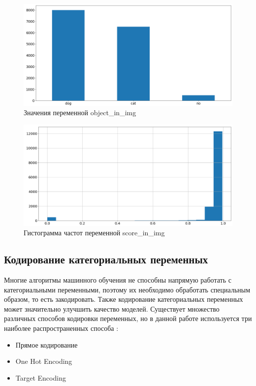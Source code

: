 \documentclass[14pt]{mmcs_article}
\begin{document}
\begin{figure}[H]
	\centering
	\includegraphics[scale=0.5]{objectimg.png}
	\caption{Значения переменной object\_in\_img}\label{analyse:objectimg}
\end{figure}

\begin{figure}[H]
	\centering
	\includegraphics[scale=0.5]{scoreimg.png}
	\caption{Гистограмма частот переменной score\_in\_img}\label{analyse:scoreimg}
\end{figure}



\subsection{Кодирование категориальных переменных}

Многие алгоритмы машинного обучения не способны напрямую работать с категориальными переменными, поэтому их необходимо обработать специальным образом, то есть закодировать. Также кодирование категориальных переменных может значительно улучшить качество моделей. Существует множество различных способов кодировки переменных, но в данной работе используется три наиболее распространенных способа \cite{lib:encode}:
\begin{itemize}
	\item Прямое кодирование
	\item One Hot Encoding
	\item Target Encoding
\end{itemize}
\end{document}

